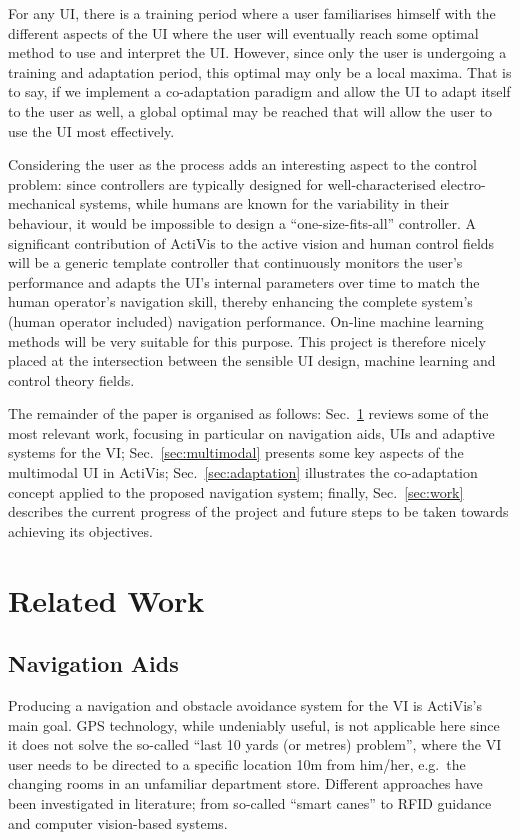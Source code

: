 \documentclass[format=sigconf, review=true, screen=true, anonymous=true]{acmart}
\begin{document}
For any UI, there is a training period where a user familiarises himself with the different aspects of the UI where the user will eventually reach some optimal method to use and interpret the UI. However, since only the user is undergoing a training and adaptation period, this optimal may only be a local maxima. That is to say, if we implement a co-adaptation paradigm and allow the UI to adapt itself to the user as well, a global optimal may be reached that will allow the user to use the UI most effectively. 

Considering the user as the process adds an interesting aspect to the control problem: since controllers are typically designed for well-characterised electro-mechanical systems, while humans are known for the variability in their behaviour, it would be impossible to design a ``one-size-fits-all'' controller. A significant contribution of ActiVis to the active vision and human control fields will be a generic template controller that continuously monitors the user's performance and adapts the UI's internal parameters over time to match the human operator's navigation skill, thereby enhancing the complete system's (human operator included) navigation performance. On-line machine learning methods will be very suitable for this purpose. This project is therefore nicely placed at the intersection between the sensible UI design, machine learning and control theory fields. 

The remainder of the paper is organised as follows: Sec.~\ref{sec:literature} reviews some of the most relevant work, focusing in particular on navigation aids, UIs and adaptive systems for the VI; Sec.~\ref{sec:multimodal} presents some key aspects of the multimodal UI in ActiVis; Sec.~\ref{sec:adaptation} illustrates the co-adaptation concept applied to the proposed navigation system; finally, Sec.~\ref{sec:work} describes the current progress of the project and future steps to be taken towards achieving its objectives.

\section{Related Work}\label{sec:literature}

\subsection{Navigation Aids}

Producing a navigation and obstacle avoidance system for the VI is ActiVis's main goal. GPS technology, while undeniably useful, is not applicable here since it does not solve the so-called ``last 10 yards (or metres) problem'', where the VI user needs to be directed to a specific location 10m from him/her, e.g.\ the changing rooms in an unfamiliar department store. Different approaches have been investigated in literature; from so-called ``smart canes'' to RFID guidance and computer vision-based systems.
\end{document}
